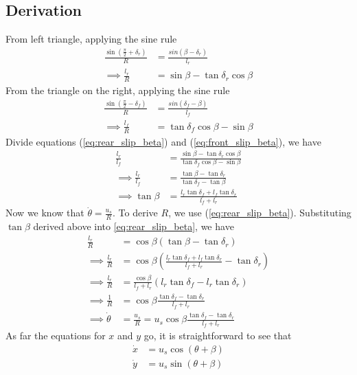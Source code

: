\subsection{Derivation}
From left triangle, applying the sine rule
\begin{align}
    \frac{\sin(\frac{\pi}{2}+\delta_r)}{R} &= \frac{sin(\beta-\delta_r)}{l_r} \\
    \implies \frac{l_r}{R} &= \sin\beta - \tan\delta_r\cos\beta \label{eq:rear_slip_beta}
\end{align}
From the triangle on the right, applying the sine rule
\begin{align}
    \frac{\sin(\frac{\pi}{2}-\delta_f)}{R} &= \frac{sin(\delta_f - \beta)}{l_f} \\
    \implies \frac{l_f}{R} &= \tan\delta_f\cos\beta - \sin\beta  \label{eq:front_slip_beta}
\end{align}
Divide equations (\ref{eq:rear_slip_beta}) and (\ref{eq:front_slip_beta}), we have
\begin{align}
    \frac{l_r}{l_f}&=\frac{\sin\beta - \tan\delta_r\cos\beta}{\tan\delta_f\cos\beta - \sin\beta} \\
    \implies \frac{l_r}{l_f}&=\frac{\tan\beta-\tan\delta_r}{\tan\delta_f - \tan\beta} \\
    \implies \tan\beta &= \frac{l_r\tan\delta_f + l_f\tan\delta_r}{l_f+l_r}
\end{align}
Now we know that $\dot{\theta}=\frac{u_s}{R}$. To derive $R$, we use (\ref{eq:rear_slip_beta}). Substituting $\tan\beta$ derived above into \ref{eq:rear_slip_beta}, we have
\begin{align}
    \frac{l_r}{R} &= \cos\beta(\tan\beta - \tan\delta_r) \\
    \implies \frac{l_r}{R} &= \cos\beta(\frac{l_r\tan\delta_f + l_f\tan\delta_r}{l_f+l_r} - \tan\delta_r) \\
    \implies \frac{l_r}{R} &= \frac{\cos\beta}{l_f+l_r}(l_r\tan\delta_f - l_r\tan\delta_r) \\
    \implies \frac{1}{R} &= \cos\beta\frac{\tan\delta_f - \tan\delta_r}{l_f+l_r} \\
    \implies \dot{\theta}&=\frac{u_s}{R}= u_s\cos\beta\frac{\tan\delta_f - \tan\delta_r}{l_f+l_r}
\end{align}
As far the equations for $x$ and $y$ go, it is straightforward to see that
\begin{align}
    \dot{x}&=u_s\cos(\theta+\beta) \\
    \dot{y}&=u_s\sin(\theta+\beta) \\
\end{align}

